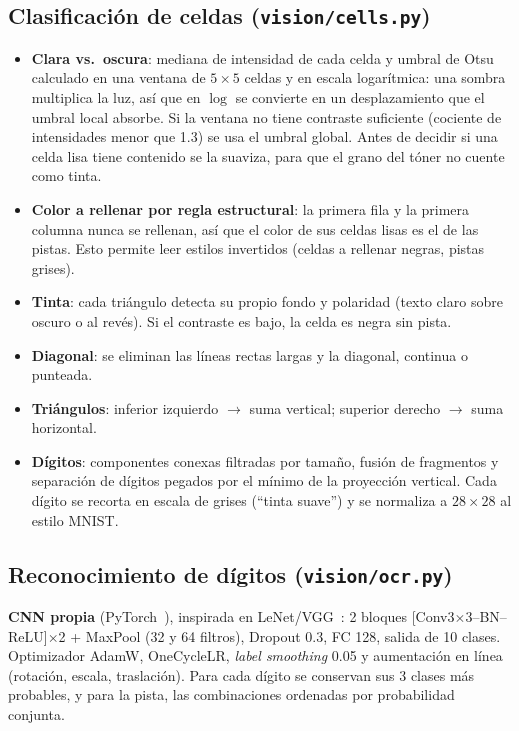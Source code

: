 \documentclass[conference,a4paper]{IEEEtran}
\begin{document}
\subsection{Clasificación de celdas (\texttt{vision/cells.py})}
\begin{itemize}
  \item \textbf{Clara vs.\ oscura}: mediana de intensidad de cada celda y umbral de Otsu~\cite{otsu} calculado en una ventana de
        $5\times5$ celdas y en escala logarítmica: una sombra multiplica la luz, así que en $\log$ se convierte en un desplazamiento
        que el umbral local absorbe. Si la ventana no tiene contraste suficiente (cociente de intensidades menor que 1.3) se usa el
        umbral global. Antes de decidir si una celda lisa tiene contenido se la suaviza, para que el grano del tóner no cuente como tinta.
  \item \textbf{Color a rellenar por regla estructural}: la primera fila y la primera columna nunca se rellenan, así que el color de sus
        celdas lisas es el de las pistas. Esto permite leer estilos invertidos (celdas a rellenar negras, pistas grises).
  \item \textbf{Tinta}: cada triángulo detecta su propio fondo y polaridad (texto claro sobre oscuro o al revés). Si el contraste es bajo,
        la celda es negra sin pista.
  \item \textbf{Diagonal}: se eliminan las líneas rectas largas y la diagonal, continua o punteada.
  \item \textbf{Triángulos}: inferior izquierdo $\rightarrow$ suma vertical; superior derecho $\rightarrow$ suma horizontal.
  \item \textbf{Dígitos}: componentes conexas filtradas por tamaño, fusión de fragmentos y separación de dígitos pegados por el mínimo de la proyección vertical.
        Cada dígito se recorta en escala de grises (``tinta suave'') y se normaliza a $28\times28$ al estilo MNIST.
\end{itemize}

\subsection{Reconocimiento de dígitos (\texttt{vision/ocr.py})}
\textbf{CNN propia} (PyTorch~\cite{pytorch}), inspirada en LeNet/VGG~\cite{lecun}:
2 bloques [Conv3$\times$3--BN--ReLU]$\times$2 + MaxPool (32 y 64 filtros), Dropout 0.3, FC 128, salida de 10 clases.
Optimizador AdamW, OneCycleLR, \emph{label smoothing} 0.05 y aumentación en línea (rotación, escala, traslación).
Para cada dígito se conservan sus 3 clases más probables, y para la pista, las combinaciones ordenadas por probabilidad conjunta.
\end{document}
